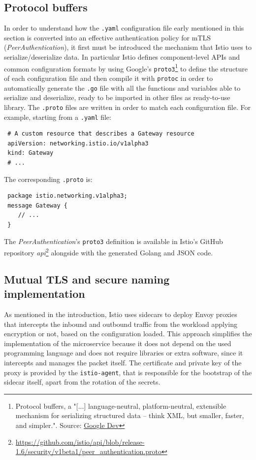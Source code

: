 \subsection{Protocol buffers}
\label{protobuf}
In order to understand how the \texttt{.yaml} configuration file early mentioned in this section is converted into an effective authentication policy for mTLS (\textit{PeerAuthentication}), it first must be introduced the mechanism that Istio uses to serialize/deserialize data. In particular Istio defines component-level APIs and common configuration formats by using Google's \texttt{proto3}\footnote{Protocol buffers, a "[...] language-neutral, platform-neutral, extensible mechanism for serializing structured data – think XML, but smaller, faster, and simpler.". Source: \href{https://developers.google.com/protocol-buffers}{Google Dev}} to define the structure of each configuration file and then compile it with \texttt{protoc} in order to automatically generate the \texttt{.go} file with all the functions and variables able to serialize and deserialize, ready to be imported in other files as ready-to-use library. The \texttt{.proto} files are written in order to match each configuration file. For example, starting from a \texttt{.yaml} file:

\begin{lstlisting}
 # A custom resource that describes a Gateway resource
 apiVersion: networking.istio.io/v1alpha3
 kind: Gateway
 # ...
\end{lstlisting}

\noindent The corresponding \texttt{.proto} is:

\begin{lstlisting}
 package istio.networking.v1alpha3;
 message Gateway {
    // ...
 }
\end{lstlisting}

The \textit{PeerAuthentication}'s \texttt{proto3} definition is available in Istio's GitHub repository \textit{api}\footnote{\url{https://github.com/istio/api/blob/release-1.6/security/v1beta1/peer_authentication.proto}} alongside with the generated Golang and JSON code.

\subsection{Mutual TLS and secure naming implementation}
As mentioned in the introduction, Istio uses sidecars to deploy Envoy proxies that intercepts the inbound and outbound traffic from the workload applying encryption or not, based on the configuration loaded. This approach simplifies the implementation of the microservice because it does not depend on the used programming language and does not require libraries or extra software, since it intercepts and manages the packet itself. 
The certificate and private key of the proxy is provided by the \texttt{istio-agent}, that is responsible for the bootstrap of the sidecar itself, apart from the rotation of the secrets.


